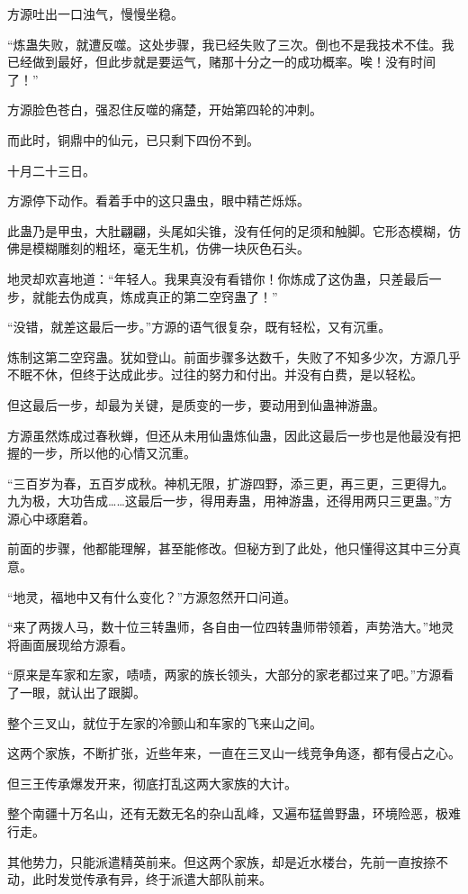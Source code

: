 \begin{this_body}
方源吐出一口浊气，慢慢坐稳。

“炼蛊失败，就遭反噬。这处步骤，我已经失败了三次。倒也不是我技术不佳。我已经做到最好，但此步就是要运气，赌那十分之一的成功概率。唉！没有时间了！”

方源脸色苍白，强忍住反噬的痛楚，开始第四轮的冲刺。

而此时，铜鼎中的仙元，已只剩下四份不到。

十月二十三日。

方源停下动作。看着手中的这只蛊虫，眼中精芒烁烁。

此蛊乃是甲虫，大肚翩翩，头尾如尖锥，没有任何的足须和触脚。它形态模糊，仿佛是模糊雕刻的粗坯，毫无生机，仿佛一块灰色石头。

地灵却欢喜地道：“年轻人。我果真没有看错你！你炼成了这伪蛊，只差最后一步，就能去伪成真，炼成真正的第二空窍蛊了！”

“没错，就差这最后一步。”方源的语气很复杂，既有轻松，又有沉重。

炼制这第二空窍蛊。犹如登山。前面步骤多达数千，失败了不知多少次，方源几乎不眠不休，但终于达成此步。过往的努力和付出。并没有白费，是以轻松。

但这最后一步，却最为关键，是质变的一步，要动用到仙蛊神游蛊。

方源虽然炼成过春秋蝉，但还从未用仙蛊炼仙蛊，因此这最后一步也是他最没有把握的一步，所以他的心情又沉重。

“三百岁为春，五百岁成秋。神机无限，扩游四野，添三更，再三更，三更得九。九为极，大功告成……这最后一步，得用寿蛊，用神游蛊，还得用两只三更蛊。”方源心中琢磨着。

前面的步骤，他都能理解，甚至能修改。但秘方到了此处，他只懂得这其中三分真意。

“地灵，福地中又有什么变化？”方源忽然开口问道。

“来了两拨人马，数十位三转蛊师，各自由一位四转蛊师带领着，声势浩大。”地灵将画面展现给方源看。

“原来是车家和左家，啧啧，两家的族长领头，大部分的家老都过来了吧。”方源看了一眼，就认出了跟脚。

整个三叉山，就位于左家的冷颤山和车家的飞来山之间。

这两个家族，不断扩张，近些年来，一直在三叉山一线竞争角逐，都有侵占之心。

但三王传承爆发开来，彻底打乱这两大家族的大计。

整个南疆十万名山，还有无数无名的杂山乱峰，又遍布猛兽野蛊，环境险恶，极难行走。

其他势力，只能派遣精英前来。但这两个家族，却是近水楼台，先前一直按捺不动，此时发觉传承有异，终于派遣大部队前来。


\end{this_body}
